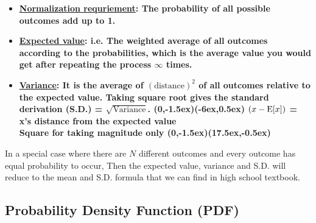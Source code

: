 \documentclass[class=article, crop=false, 12pt]{standalone}
\begin{document}
\begin{itemize}
    \item \bf{\ul{Normalization requriement}}:
    The probability of all possible outcomes add up to 1.

    \item \bf{\ul{Expected value}}: 
    i.e. The weighted average of all outcomes according to the probabilities,
    which is the average value you would get after repeating the process $\infty$ times.

    \item \bf{\ul{Variance}}:
    It is the average of $(\text{distance})^2$ of all outcomes relative to the expected value.
    Taking square root gives the \bf{standard derivation} (S.D.) = $\sqrt{\text{Variance}}$. 
    {(0,-1.5ex)}{(-6ex,0.5ex)}
    {\scriptsize $(x-\E{x})$ = x's distance from the expected value\\[-1ex] \scriptsize Square for taking magnitude only}
    {(0,-1.5ex)}{(17.5ex,-0.5ex)}
    
\end{itemize}

\begin{notation}
    In a special case where there are $N$ different outcomes and every outcome has equal probability to occur,
    Then the expected value, variance and S.D. will reduce to the mean and S.D. formula that we can find in high school textbook.

\end{notation}


\subsection{Probability Density Function (PDF)}
\end{document}
